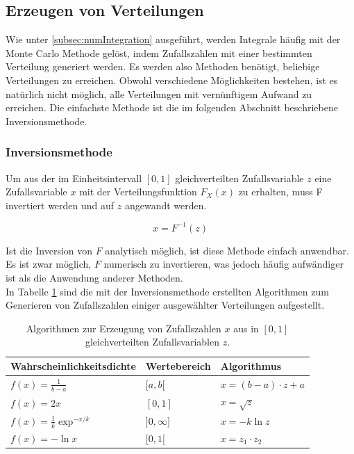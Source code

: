 \documentclass{book}
\begin{document}
\begin{refsection}
\subsection{Erzeugen von Verteilungen}
Wie unter \ref{subsec:numIntegration} ausgeführt, werden Integrale häufig mit der Monte Carlo Methode gelöst, indem Zufallszahlen mit einer bestimmten Verteilung generiert werden. Es werden also Methoden benötigt, beliebige Verteilungen zu erreichen. Obwohl verschiedene Möglichkeiten bestehen, ist es natürlich nicht möglich, alle Verteilungen mit vernünftigem Aufwand zu erreichen. Die einfachste Methode ist die im folgenden Abschnitt beschriebene Inversionsmethode. 

\subsubsection{Inversionsmethode}

Um aus der im Einheitsintervall $[0,1]$ gleichverteilten Zufallsvariable $z$  eine Zufallsvariable $x$ mit der Verteilungsfunktion $F_X(x)$ zu erhalten, muss F invertiert werden und auf $z$ angewandt werden.

\begin{equation}
	x = F^{-1}(z)
\end{equation}

Ist die Inversion von $F$ analytisch möglich, ist diese Methode einfach anwendbar. Es ist zwar möglich, $F$ numerisch zu invertieren, was jedoch häufig aufwändiger ist als die Anwendung anderer Methoden. \\

In Tabelle \ref{tab:verteilungen_erzeugen} sind die mit der Inversionsmethode erstellten Algorithmen zum Generieren von Zufallszahlen einiger ausgewählter Verteilungen aufgestellt.

\begin{table}[htbp]
	\centering
	\renewcommand{\arraystretch}{1.5}
	\begin{tabular}{|l|l|l|}
		\hline
		Wahrscheinlichkeitsdichte & Wertebereich & Algorithmus \\ \hline
		$f(x) = \frac{1}{b-a}$ & $[a,b[$ & $x = (b-a) \cdot z + a$ \\ \hline
		$f(x) = 2x$ & $[0,1]$ & $x = \sqrt{z}$ \\ \hline
		$f(x) = \frac{1}{k} \exp^{-x/k}$ & $]0,\infty]$ & $x = -k \ln z$ \\ \hline
		$f(x) = - \ln x$ & $[0,1[$ & $x = z_1 \cdot z_2$ \\ \hline
	\end{tabular}
	\caption{Algorithmen zur Erzeugung von Zufallszahlen $x$ aus in $[0,1]$ gleichverteilten Zufallsvariablen $z$.}
	\label{tab:verteilungen_erzeugen}
	\renewcommand{\arraystretch}{1.0}
\end{table}


\end{refsection}
\end{document}
